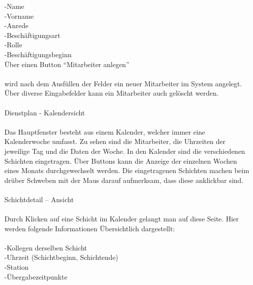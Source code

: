 \documentclass[11pt,
paper=a4,
bibtotocnumbered,	  %
liststotocnumbered,  %
DIV=calc,		  %
tablecaptionabove,	  %
headinclude,
]{article}
\begin{document}
-Name \\
-Vorname\\
-Anrede\\
-Beschäftigungsart\\
-Rolle\\
-Beschäftigungsbeginn\\

Über einen Button “Mitarbeiter anlegen” \\\\ wird nach dem Ausfüllen der Felder ein neuer Mitarbeiter im System angelegt. Über diverse Eingabefelder kann ein Mitarbeiter auch gelöscht werden.\\\\
Dienstplan - Kalendersicht\\\\
Das Hauptfenster besteht aus einem Kalender, welcher immer eine Kalenderwoche umfasst. Zu sehen sind die Mitarbeiter, die Uhrzeiten der jeweilige Tag und die Daten der Woche. In den Kalender sind die verschiedenen Schichten eingetragen. Über Buttons kann die Anzeige der einzelnen Wochen eines Monats durchgewechselt werden. Die eingetragenen Schichten machen beim drüber Schweben mit der Maus darauf aufmerksam, dass diese anklickbar sind.\\\\
Schichtdetail – Ansicht\\\\
Durch Klicken auf eine Schicht im Kalender gelangt man auf diese Seite. Hier werden folgende Informationen Übersichtlich dargestellt:\\\\
-Kollegen derselben Schicht \\
-Uhrzeit (Schichtbeginn, Schichtende)\\
-Station\\
-Übergabezeitpunkte\\
\end{document}
